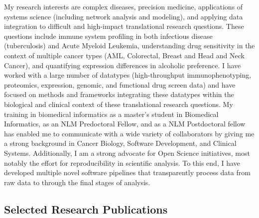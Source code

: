 \documentclass[11pt,]{article}
\begin{document}
My research interests are complex diseases, precision medicine,
applications of systems science (including network analysis and
modeling), and applying data integration to difficult and high-impact
translational research questions. These questions include immune system
profiling in both infectious disease (tuberculosis) and Acute Myeloid
Leukemia, understanding drug sensitivity in the context of multiple
cancer types (AML, Colorectal, Breast and Head and Neck Cancer), and
quantifying expression differences in alcoholic preference. I have
worked with a large number of datatypes (high-throughput
immunophenotyping, proteomics, expression, genomic, and functional drug
screen data) and have focused on methods and frameworks integrating
these datatypes within the biological and clinical context of these
translational research questions. My training in biomedical informatics
as a master's student in Biomedical Informatics, as an NLM Predoctoral
Fellow, and as a NLM Postdoctoral fellow has enabled me to communicate
with a wide variety of collaborators by giving me a strong background in
Cancer Biology, Software Development, and Clinical Systems.
Additionally, I am a strong advocate for Open Science initiatives, most
notably the effort for reproducibility in scientific analysis. To this
end, I have developed multiple novel software pipelines that
transparently process data from raw data to through the final stages of
analysis.

\subsection{Selected Research
Publications}\label{selected-research-publications}
\end{document}
